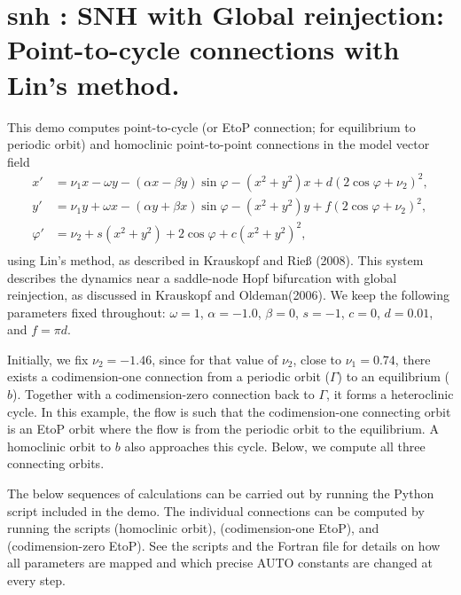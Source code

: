 \documentclass[12pt]{report}
\begin{document}
\newpage
\section{ snh : SNH with Global reinjection: Point-to-cycle connections with Lin's method.} \label{sec:Demos_snh}
This demo computes point-to-cycle
(or EtoP connection; for equilibrium to periodic orbit)
and homoclinic point-to-point connections in the model vector field
\begin{equation} \begin{array}{cl}
  x' &=  \nu_1 x - \omega y - (\alpha x - \beta y) \sin \varphi -
  (x^2+y^2)x + d (2 \cos \varphi+\nu_2)^2, \\
  y' &=  \nu_1 y + \omega x - (\alpha y + \beta x) \sin \varphi -
  (x^2+y^2) y + f (2 \cos \varphi+\nu_2)^2,  \\
  \varphi' &=  \nu_2 + s (x^2+y^2) + 2 \cos \varphi + c(x^2+y^2)^2,
  \\ \end{array} \end{equation}
using Lin's method, as described in Krauskopf and Rie\ss
(2008). %
This system describes the dynamics near a saddle-node Hopf bifurcation
with global reinjection, as discussed in Krauskopf and Oldeman(2006).
We keep the following parameters fixed throughout: $\omega=1$,
$\alpha=-1.0$, $\beta=0$, $s=-1$, $c=0$, $d=0.01$, and $f=\pi d$.

Initially, we fix $\nu_2=-1.46$, since
for that value of $\nu_2$, close to $\nu_1=0.74$,
there exists a codimension-one connection from a periodic orbit
($\Gamma$) to an equilibrium ($b$). Together with a codimension-zero connection
back to $\Gamma$, it forms a heteroclinic cycle. In this example, the
flow is such that the codimension-one connecting orbit is an EtoP
orbit where the flow is from the periodic orbit to the equilibrium.
A homoclinic orbit
to $b$ also approaches this cycle. Below, we compute all three
connecting orbits.

The below sequences of calculations can be carried out by
running the Python script  included in the demo.
The individual connections can be computed by running the scripts
 (homoclinic orbit),  (codimension-one
EtoP), and  (codimension-zero EtoP).
See the scripts and the Fortran file  for details on
how all parameters are mapped and which precise AUTO constants
are changed at every step.
\end{document}
